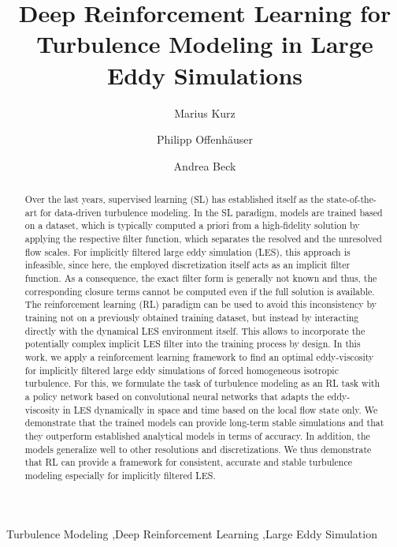 \begin{frontmatter}



\title{Deep Reinforcement Learning for Turbulence Modeling in Large Eddy Simulations}

\author[label1]{Marius Kurz}

\author[label2]{Philipp Offenh\"auser}

\author[label1]{Andrea Beck}

\address[label1]{Institute of Aerodynamics and Gas Dynamics, University of Stuttgart, Pfaffenwaldring 21, 70569 Stuttgart, Germany}
\address[label2]{Hewlett Packard Enterprise (HPE), Herrenberger Straße 140, 71034  Böblingen, Germany}



\begin{abstract}

  Over the last years, supervised learning (SL) has established itself as the state-of-the-art for data-driven turbulence modeling.
  In the SL paradigm, models are trained based on a dataset, which is typically computed a priori from a high-fidelity solution by applying the respective filter function, which separates the resolved and the unresolved flow scales.
  For implicitly filtered large eddy simulation (LES), this approach is infeasible, since here, the employed discretization itself acts as an implicit filter function.
  As a consequence, the exact filter form is generally not known and thus, the corresponding closure terms cannot be computed even if the full solution is available.
  The reinforcement learning (RL) paradigm can be used to avoid this inconsistency by training not on a previously obtained training dataset, but instead by interacting directly with the dynamical LES environment itself.
  This allows to incorporate the potentially complex implicit LES filter into the training process by design.
  In this work, we apply a reinforcement learning framework to find an optimal eddy-viscosity for implicitly filtered large eddy simulations of forced homogeneous isotropic turbulence.
  For this, we formulate the task of turbulence modeling as an RL task with a policy network based on convolutional neural networks that adapts the eddy-viscosity in LES dynamically in space and time based on the local flow state only.
  We demonstrate that the trained models can provide long-term stable simulations and that they outperform established analytical models in terms of accuracy.
  In addition, the models generalize well to other resolutions and discretizations.
  We thus demonstrate that RL can provide a framework for consistent, accurate and stable turbulence modeling especially for implicitly filtered LES.
\end{abstract}



\begin{keyword}
  Turbulence Modeling \sep Deep Reinforcement Learning \sep Large Eddy Simulation
\end{keyword}

\end{frontmatter}


